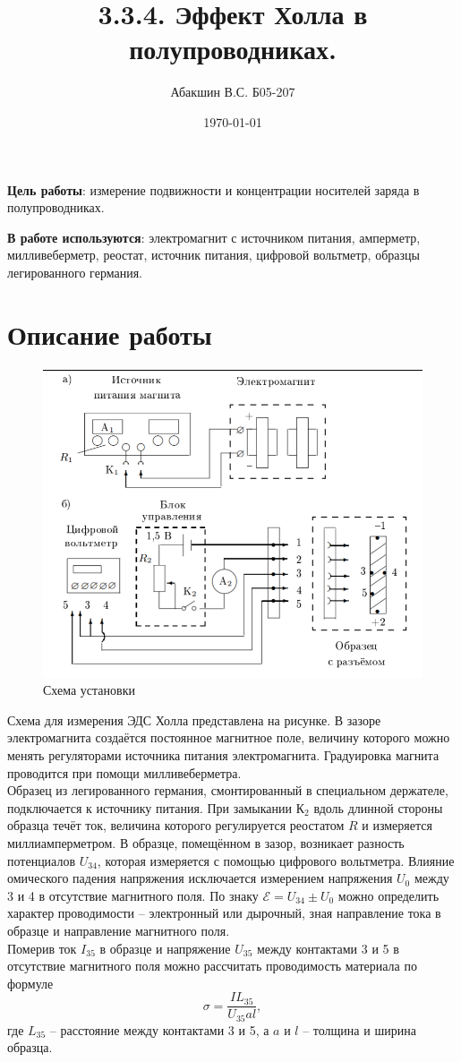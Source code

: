 \documentclass[a4paper, 14pt]{article}
\author{Абакшин В.С. Б05-207}
\title{3.3.4. Эффект Холла в полупроводниках.}
\date{\today}
\begin{document}
	\maketitle
	\textbf{Цель работы}: измерение подвижности и концентрации носителей заряда в полупроводниках.
	
	
	\textbf{В работе используются}: электромагнит с источником питания, амперметр, милливеберметр, реостат, источник питания, цифровой вольтметр, образцы легированного германия.\\
	\section*{Описание работы}
	\begin{figure}[h!]
		\centering
		\includegraphics[scale=0.7]{1.png}
		\caption{Схема установки}
	\end{figure}
	Схема для измерения ЭДС Холла представлена на рисунке. В зазоре электромагнита создаётся постоянное магнитное поле, величину которого можно менять регуляторами источника питания электромагнита. Градуировка магнита проводится при помощи милливеберметра.\\
	Образец из легированного германия, смонтированный в специальном держателе, подключается к источнику питания. При замыкании К$_2$ вдоль длинной стороны образца течёт ток, величина которого регулируется реостатом $R$ и измеряется миллиамперметром. В образце, помещённом в зазор, возникает разность потенциалов $U_{34}$, которая измеряется с помощью цифрового вольтметра.
	Влияние омического падения напряжения исключается измерением напряжения $U_0$ между 3 и 4 в отсутствие магнитного поля. По знаку $\mathcal{E} = U_{34} \pm U_0$ можно определить характер проводимости -- электронный или дырочный, зная направление тока в образце и направление магнитного поля.\\
	Померив ток $I_{35}$ в образце и напряжение $U_{35}$ между контактами 3 и 5 в отсутствие магнитного поля можно рассчитать проводимость материала по формуле
	$$
	\sigma = \frac{IL_{35}}{U_{35}al},
	$$
	где $L_{35}$ -- расстояние между контактами 3 и 5, а $a$ и $l$ -- толщина и ширина образца.
\end{document}
